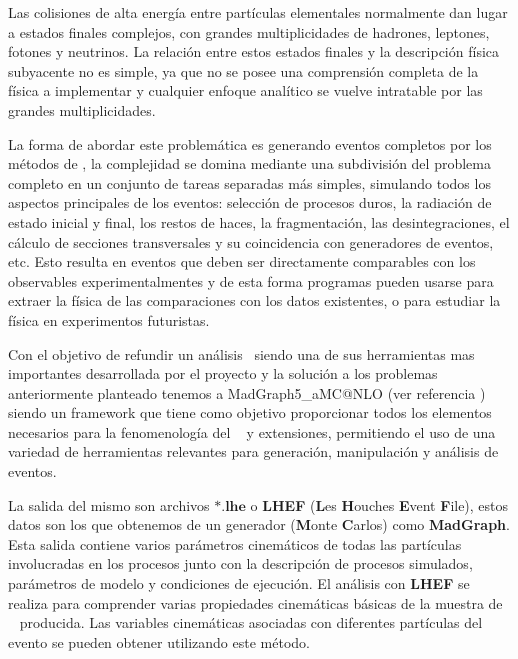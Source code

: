 Las colisiones de alta energía entre partículas elementales normalmente dan lugar a estados finales complejos, con grandes multiplicidades de hadrones, leptones, fotones y neutrinos. La relación entre estos estados finales y la descripción física subyacente no es simple, ya que no se posee una comprensión completa de la física a implementar y cualquier enfoque analítico se vuelve intratable por las grandes multiplicidades.

La forma de abordar este problemática es generando eventos completos por los métodos de \MC, la complejidad se domina mediante una subdivisión del problema completo en un conjunto de tareas separadas más simples, simulando todos los aspectos principales de los eventos: selección de procesos duros, la radiación de estado inicial y final, los restos de haces, la fragmentación, las desintegraciones, el cálculo de secciones transversales y su coincidencia con generadores de eventos, etc. Esto resulta en eventos que deben ser directamente comparables con los observables experimentalmentes y de esta forma programas pueden usarse para extraer la física de las comparaciones con los datos existentes, o para estudiar la física en experimentos futuristas.

Con el objetivo de refundir un análisis \LHC ~siendo una de sus herramientas mas importantes desarrollada por el proyecto y la solución a los problemas anteriormente planteado tenemos a MadGraph5\_aMC@NLO (ver referencia \cite{alwall_automated_2014}) siendo un framework que tiene como objetivo proporcionar todos los elementos necesarios para la fenomenología del \ME ~ y extensiones, permitiendo el uso de una variedad de herramientas relevantes para generación, manipulación y análisis de eventos. 


La salida del mismo son archivos $\mathbf{*.lhe}$ o \textbf{LHEF} (\textbf{L}es \textbf{H}ouches \textbf{E}vent \textbf{F}ile), estos datos son los que obtenemos de un generador \MC (\textbf{M}onte \textbf{C}arlos) como \textbf{MadGraph}. Esta salida contiene varios parámetros cinemáticos de todas las partículas involucradas en los procesos junto con la descripción de procesos simulados, parámetros de modelo y condiciones de ejecución. El análisis con \textbf{LHEF} se realiza para comprender varias propiedades cinemáticas básicas de la muestra de \MC ~ producida. Las variables cinemáticas asociadas con diferentes partículas del evento se pueden obtener utilizando este método.


